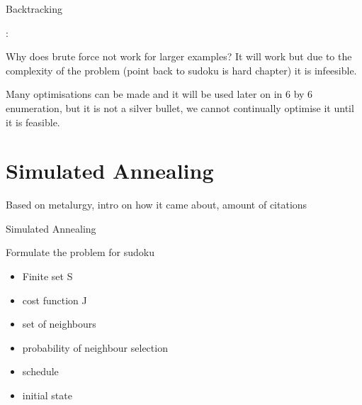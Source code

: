 \documentclass[a4paper,11pt]{report}
\newcounter{row}
\newcounter{col}
\begin{document}
\begin{algorithm}
\caption{Backtracking}
\begin{algorithmic}
                \Else:
	       \EndIf
		\EndIf
\EndIf
\EndFor
\EndFor
\EndProcedure						
\end{algorithmic}
\end{algorithm}

Why does brute force not work for larger examples? It will work but due to the complexity of the problem (point back to sudoku is hard chapter) it is infeesible.

Many optimisations can be made and it will be used later on in 6 by 6 enumeration, but it is not a silver bullet, we cannot continually optimise it until it is feasible.

\section{Simulated Annealing} 

Based on metalurgy, intro on how it  came about, amount of citations

\begin{algorithm}
\caption{Simulated Annealing}
\begin{algorithmic}
		\Else
			\EndIf
		\EndIf
	\EndFor
\EndProcedure
\end{algorithmic}
\end{algorithm}

Formulate the problem for sudoku
\begin{itemize}
\item Finite set S
\item cost function J
\item set of neighbours
\item probability of neighbour selection
\item schedule
\item initial state
\end{itemize}
\end{document}
